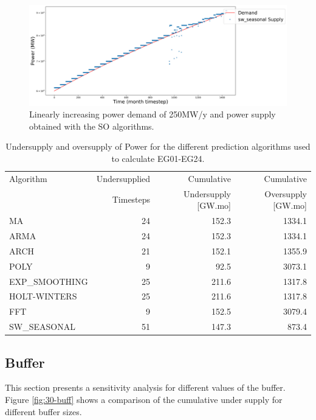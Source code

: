 \documentclass[11pt]{article}
\begin{document}
\begin{figure}[H]
	\centering
	\includegraphics[width=\textwidth]{30-figures/lin-30-power-buffer03.png} 
	\hfill
	\caption{Linearly increasing power demand of 250MW/y and power supply obtained with the SO algorithms.}
	\label{fig:30-lin-SO}
\end{figure}

\begin{table}[H]
	\centering
	\caption{Undersupply and oversupply of Power for the different prediction algorithms used to calculate EG01-EG24.}
	\label{tab:30-lin-power}
	\begin{tabularx}{\textwidth}{lRRR}
		\hline
		Algorithm & Undersupplied & Cumulative  & Cumulative \\
		& Timesteps     & Undersupply [GW.mo]  & Oversupply [GW.mo] \\ \hline
		MA        & 24 & 152.3 & 1334.1 \\ 
		ARMA      & 24 & 152.3 & 1334.1 \\ 
		ARCH      & 21 & 152.1 & 1355.9 \\ 
		POLY      &  9 & 92.5 & 3073.1 \\ 
		EXP\_SMOOTHING 	& 25 & 211.6 & 1317.8 \\ 
		HOLT-WINTERS  	& 25 & 211.6 & 1317.8 \\ 
		FFT       & 9 & 152.5 & 3079.4 \\ 
		SW\_SEASONAL  & 51 & 147.3 & 873.4 \\ \hline
	\end{tabularx}
\end{table}

\subsection{Buffer}

This section presents a sensitivity analysis for different values of the buffer. Figure \ref{fig:30-buff} shows a comparison of the cumulative under supply for different buffer sizes.
\end{document}
